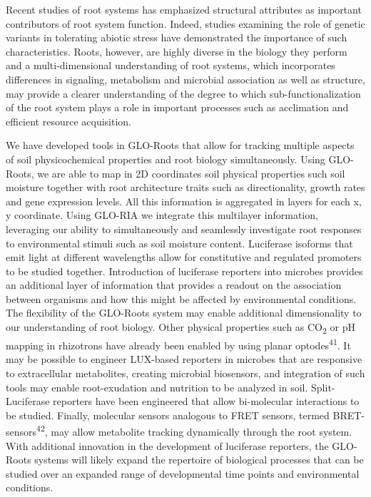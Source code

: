 \documentclass[]{article}
\begin{document}
Recent studies of root systems has emphasized structural attributes as
important contributors of root system function. Indeed, studies
examining the role of genetic variants in tolerating abiotic stress have
demonstrated the importance of such characteristics. Roots, however, are
highly diverse in the biology they perform and a multi-dimensional
understanding of root systems, which incorporates differences in
signaling, metabolism and microbial association as well as structure,
may provide a clearer understanding of the degree to which
sub-functionalization of the root system plays a role in important
processes such as acclimation and efficient resource acquisition.

We have developed tools in GLO-Roots that allow for tracking multiple
aspects of soil physicochemical properties and root biology
simultaneously. Using GLO-Roots, we are able to map in 2D coordinates
soil physical properties such soil moisture together with root
architecture traits such as directionality, growth rates and gene
expression levels. All this information is aggregated in layers for each
x, y coordinate. Using GLO-RIA we integrate this multilayer information,
leveraging our ability to simultaneously and seamlessly investigate root
responses to environmental stimuli such as soil moisture content.
Luciferase isoforms that emit light at different wavelengths allow for
constitutive and regulated promoters to be studied together.
Introduction of luciferase reporters into microbes provides an
additional layer of information that provides a readout on the
association between organisms and how this might be affected by
environmental conditions. The flexibility of the GLO-Roots system may
enable additional dimensionality to our understanding of root biology.
Other physical properties such as CO\textsubscript{2} or pH mapping in
rhizotrons have already been enabled by using planar
optodes\textsuperscript{41}. It may be possible to engineer LUX-based
reporters in microbes that are responsive to extracellular metabolites,
creating microbial biosensors, and integration of such tools may enable
root-exudation and nutrition to be analyzed in soil. Split-Luciferase
reporters have been engineered that allow bi-molecular interactions to
be studied. Finally, molecular sensors analogous to FRET sensors, termed
BRET-sensors\textsuperscript{42}, may allow metabolite tracking
dynamically through the root system. With additional innovation in the
development of luciferase reporters, the GLO-Roots systems will likely
expand the repertoire of biological processes that can be studied over
an expanded range of developmental time points and environmental
conditions.
\end{document}
